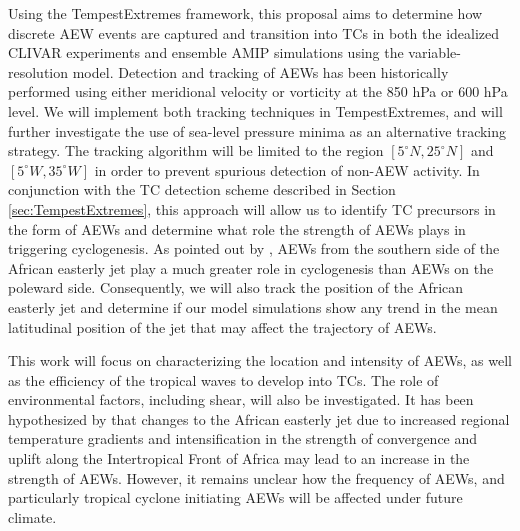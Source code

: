 \documentclass[11pt]{article}
\begin{document}
Using the TempestExtremes framework, this proposal aims to determine how discrete AEW events are captured and transition into TCs in both the idealized CLIVAR experiments and ensemble AMIP simulations using the variable-resolution model.  Detection and tracking of AEWs has been historically performed using either meridional velocity \citep{Burpee1974, Reed1977} or vorticity \citep{hodges1995feature, thorncroft2001african} at the 850 hPa or 600 hPa level.  We will implement both tracking techniques in TempestExtremes, and will further investigate the use of sea-level pressure minima as an alternative tracking strategy.  The tracking algorithm will be limited to the region $[5^\circ N, 25^\circ N]$ and $[5^\circ W, 35^\circ W]$ in order to prevent spurious detection of non-AEW activity.  In conjunction with the TC detection scheme described in Section \ref{sec:TempestExtremes}, this approach will allow us to identify TC precursors in the form of AEWs and determine what role the strength of AEWs plays in triggering cyclogenesis.  As pointed out by \cite{thorncroft2001african}, AEWs from the southern side of the African easterly jet play a much greater role in cyclogenesis than AEWs on the poleward side.  Consequently, we will also track the position of the African easterly jet and determine if our model simulations show any trend in the mean latitudinal position of the jet that may affect the trajectory of AEWs.

This work will focus on characterizing the location and intensity of AEWs, as well as the efficiency of the tropical waves to develop into TCs.  The role of environmental factors, including shear, will also be investigated. It has been hypothesized by \cite{Skinner&Diffenbaugh2014} that changes to the African easterly jet due to increased regional temperature gradients and intensification in the strength of convergence and uplift along the Intertropical Front of Africa may lead to an increase in the strength of AEWs.  However, it remains unclear how the frequency of AEWs, and particularly tropical cyclone initiating AEWs will be affected under future climate.


\end{document}
